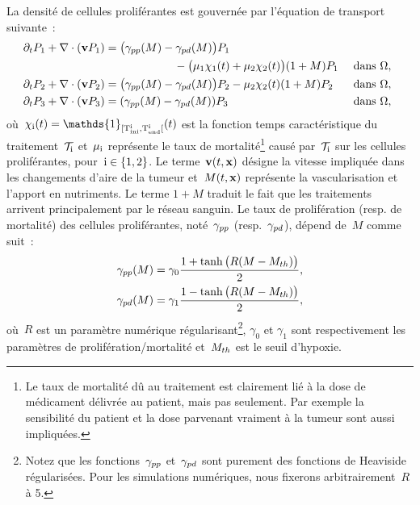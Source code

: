 \documentclass[main.tex]{subfiles}
\begin{document}
La densité de cellules proliférantes est gouvernée par l'équation de transport suivante~:
\begin{align}
\mkern-8mu \partial_t P_1 & + \dive(\vit P_1) = \big(\gammapp(M)- \gammapd(M)\big)P_1 \nonumber \\
 & \hspace{4cm}  - \big(\muI \chiI (t)+\muS \chiS(t) \big)(1+M)P_1 & \textrm{ dans } \Omega, \label{eq_P1}\\
\mkern-8mu \partial_t P_2 &+ \dive(\vit P_2) = \big(\gammapp(M)- \gammapd(M)\big)P_2 - \muS \chiS(t) (1+M)P_2 & \textrm{ dans }  \Omega, \label{eq_P2}\\
\mkern-8mu \partial_t P_3 &+ \dive(\vit P_3) = (\gammapp(M) - \gammapd(M))P_3 & \textrm{ dans }  \Omega, \label{eq_P3}
\end{align}%
où~$\chii(t)=\mathds{1}_{[\Tini{i},\rm \Tend{i}[}(t)$ est la fonction temps caractéristique du 
traitement~$\mathcal{T}_{\rm i}$ et~$\mu_{\rm i}$ représente le taux de mortalité\footnote{Le taux de mortalité dû au traitement est clairement lié à la dose de médicament délivrée au patient, mais pas seulement. Par exemple la sensibilité du patient et la dose parvenant vraiment à la tumeur sont aussi impliquées.} causé par~$\mathcal{T}_{\rm i}$ sur les cellules proliférantes, pour~$\rm i\in\{1,2\}$. 
Le terme~$\mathbf{v} (t,\mathbf{x})$ désigne la vitesse impliquée dans les changements d'aire de la tumeur et~$M(t,\mathbf{x})$ représente la vascularisation et l'apport en nutriments. 
Le terme $1+M$ traduit le fait que les traitements arrivent principalement par le réseau sanguin. 
Le taux de prolifération (resp. de mortalité) des cellules proliférantes, noté~$\gamma_{pp}$ (resp.~$\gamma_{pd}$), dépend de~$M$ comme suit~:
\begin{align}
\gamma_{pp}(M) &=\gamma_0 \frac{1+\tanh\big(R(M-M_{th})\big)}{2}, \label{eq_gammapp}\\
\gamma_{pd}(M) &=\gamma_1 \frac{1-\tanh\big(R(M-M_{th})\big)}{2}, \label{eq_gammapd}
\end{align}
où~$R$ est un paramètre numérique régularisant\footnote{Notez que les fonctions~$\gamma_{pp}$ et~$\gamma_{pd}$ sont purement des fonctions de Heaviside régularisées. Pour les simulations numériques, nous fixerons arbitrairement~$R$ à 5.}, $\gamma_0$ et
$\gamma_1$ sont respectivement les paramètres de 
prolifération/mortalité et~$M_{th}$ est le seuil d'hypoxie.
\end{document}

